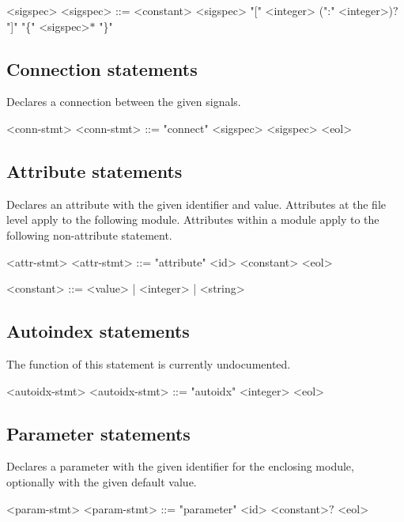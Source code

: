 \begin{indentgrammar}{<sigspec>}
<sigspec> ::=
<constant>
    \alt <sigspec> "[" <integer> (":" <integer>)$?$ "]"
    \alt "\{" <sigspec>$*$ "\}"
\end{indentgrammar}

\subsection{Connection statements}

Declares a connection between the given signals.

\begin{indentgrammar}{<conn-stmt>}
<conn-stmt> ::= "connect" <sigspec> <sigspec> <eol>
\end{indentgrammar}

\subsection{Attribute statements}

Declares an attribute with the given identifier and value. Attributes at the file level apply to the following module. Attributes within a module apply to the following non-attribute statement.

\begin{indentgrammar}{<attr-stmt>}
<attr-stmt> ::= "attribute" <id> <constant> <eol>

<constant> ::= <value> | <integer> | <string>
\end{indentgrammar}

\subsection{Autoindex statements}

The function of this statement is currently undocumented.

\begin{indentgrammar}{<autoidx-stmt>}
<autoidx-stmt> ::= "autoidx" <integer> <eol>
\end{indentgrammar}

\subsection{Parameter statements}

Declares a parameter with the given identifier for the enclosing module, optionally with the given default value.

\begin{indentgrammar}{<param-stmt>}
<param-stmt> ::= "parameter" <id> <constant>$?$ <eol>
\end{indentgrammar}

